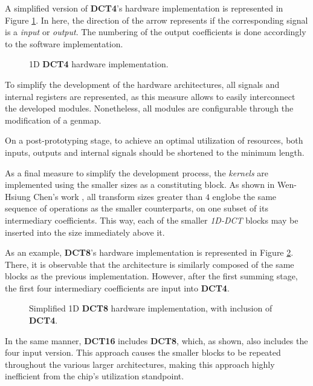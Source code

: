 A simplified version of \textbf{DCT4}'s hardware implementation is represented in Figure \ref{fig:harddct4v1}. In here, the direction of the arrow represents if the corresponding signal is a \emph{input} or \emph{output}. The numbering of the output coefficients is done accordingly to the software implementation.

\begin{figure}[!htbp]
    \centering
    
    \caption{1D \textbf{DCT4} hardware implementation.}
    \label{fig:harddct4v1}
\end{figure}

To simplify the development of the hardware architectures, all signals and internal registers are represented, as this measure allows to easily interconnect the developed modules. Nonetheless, all modules are configurable through the modification of a \gls{genmap}.

On a post-prototyping stage, to achieve an optimal utilization of resources, both inputs, outputs and internal signals should be shortened to the minimum length.

As a final measure to simplify the development process, the \emph{kernels} are implemented using the smaller sizes as a constituting block. As shown in Wen-Hsiung Chen's work \cite{wen-hsiungchenFastComputationalAlgorithm1977}, all transform sizes greater than $4$ englobe the same sequence of operations as the smaller counterparts, on one subset of its intermediary coefficients. This way, each of the smaller \emph{1D-DCT} blocks may be inserted into the size immediately above it.

As an example, \textbf{DCT8}'s hardware implementation is represented in Figure \ref{fig:harddct8v1}. There, it is observable that the architecture is similarly composed of the same blocks as the previous implementation. However, after the first summing stage, the first four intermediary coefficients are input into \textbf{DCT4}. 

\begin{figure}[!htbp]
    \centering
    
    \caption{Simplified 1D \textbf{DCT8} hardware implementation, with inclusion of \textbf{DCT4}.}
    \label{fig:harddct8v1}
\end{figure}

In the same manner, \textbf{DCT16} includes \textbf{DCT8}, which, as shown, also includes the four input version. This approach causes the smaller blocks to be repeated throughout the various larger architectures, making this approach highly inefficient from the chip's utilization standpoint.

